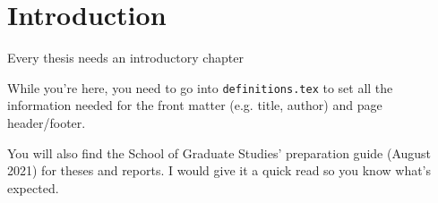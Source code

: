 \chapter{Introduction}

Every thesis needs an introductory chapter

While you're here, you need to go into \texttt{definitions.tex} to set all the 
information needed for the front matter (e.g. title, author) and page 
header/footer.

You will also find the School of Graduate Studies' preparation guide (August 
2021) for theses and reports. I would give it a quick read so you know what's 
expected.